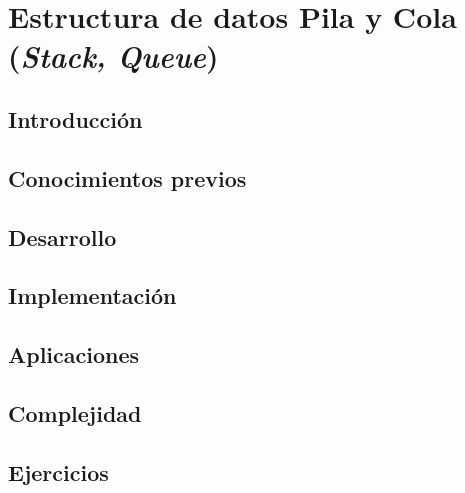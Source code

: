 \chapter{Estructura de datos Pila y Cola (\emph{Stack, Queue})}
\section{Introducción}

\section{Conocimientos previos}

\section{Desarrollo}

\section{Implementación}

\section{Aplicaciones}

\section{Complejidad}

\section{Ejercicios}
